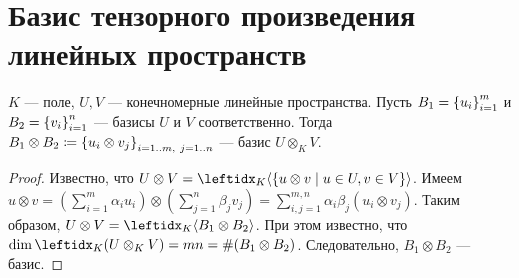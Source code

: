 \section{Базис тензорного произведения линейных пространств}

\begin{thm*}
    $K$ --- поле, $U, V$ --- конечномерные линейные пространства. Пусть $B_1 = \left\{u_i\right\}_{i=1}^{m}$ и $B_2 = \left\{v_i\right\}_{i=1}^{n}$ --- базисы $U$ и $V$ соответственно. Тогда $B_1 \otimes B_2 \coloneqq \left\{u_i \otimes v_j\right\}_{i=1..m,\ j=1..n}^{}$ --- базис $U \otimes_K V$.
\end{thm*}

\begin{proof}
    Известно, что $U \otimes V = \gen{K}{\{u \otimes v \mid u \in U, v \in V\}}$. Имеем $u \otimes v = \left(\sum_{i=1}^{m} \alpha_i u_i\right) \otimes \left(\sum_{j=1}^{n} \beta_j v_j \right) = \sum_{i,j=1}^{m,n} \alpha_i \beta_j (u_i \otimes v_j)$. Таким образом, $U \otimes V = \gen{K}{B_1 \otimes B_2}$. При этом известно, что $\dim \lsub{K}{(U \otimes_K V)} = mn = \#(B_1 \otimes B_2)$. Следовательно, $B_1 \otimes B_2$ --- базис.
\end{proof}